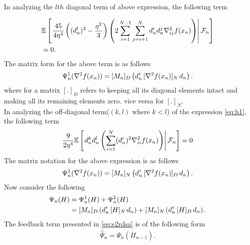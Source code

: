 \documentclass[letterpaper, 10 pt, conference]{ieeeconf}  %
\begin{document}
In analyzing the $lth$ diagonal term of above expression, the following term

\begin{align}
& \mathbb{E}\left[\left.\dfrac{45}{4\eta^4} \left((d_n^l)^2-\frac{\eta^2}{3}\right) \left(2\sum\limits_{i=1}^{N-1}\sum\limits_{j=i+1}^N d_n^i d_n^j \nabla^2_{ij} f(x_n)\right)\right| \mathcal{F}_{n}\right]\nonumber \\ &= 0.\label{eq:h2}
\end{align}
The matrix form for the above term is as follows 
\begin{align}\label{eq:digmat}
\Psi_{n}^{1}(\nabla^2 f(x_n)) = [M_n]_{D}\left(d_{n}^\mathsf{\scriptscriptstyle T} \, [\nabla^2 f(x_n)]_{N} \, d_{n}\right).
\end{align}
where for a matrix $[.]_{D}$ refers to keeping all its diagonal elements intact and making all its remaining elements zero. vice versa for $[.]_{N}$.\\

In analyzing the off-diagonal term($(k,l)$ where $k < l$) of the expression \eqref{eq:h1}, the following term
\begin{align}
& \dfrac{9}{2\eta^4} \mathbb{E}\left[\left.d_n^k d_n^l   \left(\sum\limits_{i=1}^N (d_n^i)^2 \nabla^2_{ii} f(x_n)\right)\right| \mathcal{F}_n \right] = 0\nonumber\\
\end{align}
The matrix notation for the above expression is as follows
\begin{align}\label{eq:ndmat}
\Psi_{n}^{2}(\nabla^2 f(x_n)) = [M_n]_{N}\left(d_{n}^\mathsf{\scriptscriptstyle T} \, [\nabla^2 f(x_n)]_{D} \, d_{n}\right).
\end{align}
Now consider the following
\begin{align}
\Psi_{n}(H) &= \Psi_{n}^{1}(H) + \Psi_{n}^{2}(H)\nonumber\\
&= [M_n]_{D}\left(d_{n}^\mathsf{\scriptscriptstyle T} \, [H]_{N} \, d_{n}\right) +  [M_n]_{N}\left(d_{n}^\mathsf{\scriptscriptstyle T} \, [H]_{D} \, d_{n}\right).
\end{align}
The feedback term presented in \eqref{eq:e2rdsa} is of the following form
\begin{align}
\widehat \Psi_n = \Psi_{n} (\overline H_{n-1}).
\end{align}
\end{document}
